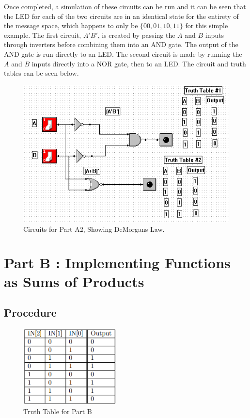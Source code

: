 \documentclass[a4paper,11pt]{article}
\begin{document}
Once completed, a simulation of these circuits can be run and it can be seen that the LED for each of the two circuits are in an identical state for the entirety of the message space, which happens to only be $ \lbrace 00, 01, 10, 11 \rbrace $ for this simple example. The first circuit, $A'B'$, is created by passing the $A$ and $B$ inputs through inverters before combining them into an AND gate. The output of the AND gate is run directly to an LED. The second circuit is made by running the $A$ and $B$ inputs directly into a NOR gate, then to an LED. The circuit and truth tables can be seen below. \\
\begin{figure}[h!]
   \centering
     \includegraphics[width=5in]{PartADM}
   \caption{Circuits for Part A2, Showing DeMorgans Law.}
   \label{fig:parta2}
\end{figure}  




\section{Part B : Implementing Functions as Sums of Products}
\subsection{Procedure}

\begin{figure}
   \includegraphics[width=2in]{PartBTT}
   \caption{Truth Table for Part B}
   \label{fig:partbtt}
\end{figure} 
\end{document}
